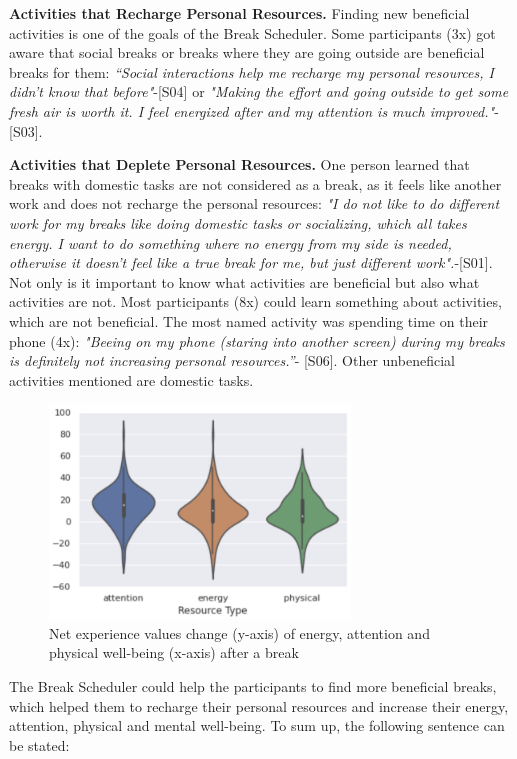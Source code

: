 \documentclass{hasel_thesis}
\begin{document}
\textbf{Activities that Recharge Personal Resources.} Finding new beneficial activities is one of the goals of the Break Scheduler. Some participants (3x) got aware that social breaks or breaks where they are going outside are beneficial breaks for them: \textit{“Social interactions help me recharge my personal resources, I didn't know that before"}-[S04] or \textit{"Making the effort and going outside to get some fresh air is worth it. I feel energized after and my attention is much improved."}-[S03]. 

\textbf{Activities that Deplete Personal Resources.} One person learned that breaks with domestic tasks are not considered as a break, as it feels like another work and does not recharge the personal resources: \textit{"I do not like to do different work for my breaks like doing domestic tasks or socializing, which all takes energy. I want to do something where no energy from my side is needed, otherwise it doesn't feel like a true break for me, but just different work".}-[S01]. Not only is it important to know what activities are beneficial but also what activities are not. Most participants (8x) could learn something about activities, which are not beneficial. The most named activity was spending time on their phone (4x): \textit{"Beeing on my phone (staring into another screen) during my breaks is definitely not increasing personal resources.”}- [S06]. Other unbeneficial activities mentioned are domestic tasks. 

\begin{figure}[htp]
    \centering
    \includegraphics[width=8cm]{hasel_thesis/images/change_break.png}
    \caption{Net experience values change (y-axis) of energy, attention and physical well-being (x-axis) after a break}
    \label{fig:change_break}
\end{figure}

The Break Scheduler could help the participants to find more beneficial breaks, which helped them to recharge their personal resources and increase their energy, attention, physical and mental well-being. To sum up, the following sentence can be stated:
\end{document}
